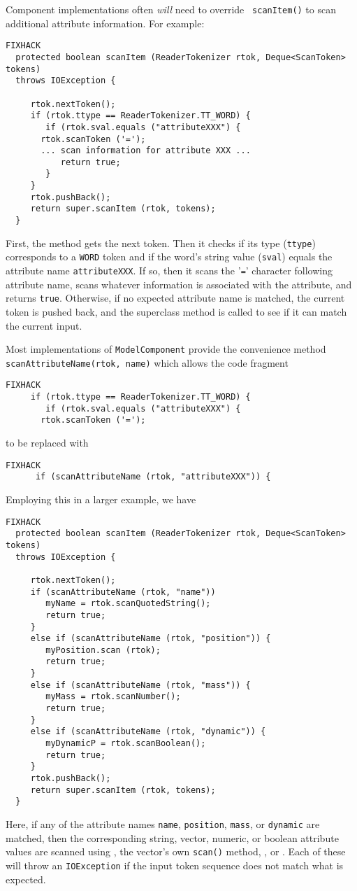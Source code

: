 \documentclass{article}
\begin{document}
Component implementations often {\it will} need to override {\tt
scanItem()} to scan additional attribute information. For example:
\begin{lstlisting}FIXHACK
  protected boolean scanItem (ReaderTokenizer rtok, Deque<ScanToken> tokens)
  throws IOException {

     rtok.nextToken();
     if (rtok.ttype == ReaderTokenizer.TT_WORD) {
        if (rtok.sval.equals ("attributeXXX") {
	   rtok.scanToken ('=');
	   ... scan information for attribute XXX ...
           return true;
        }
     }
     rtok.pushBack();
     return super.scanItem (rtok, tokens);
  }	
\end{lstlisting}
First, the method gets the next token. Then it checks if its type
({\tt ttype}) corresponds to a {\tt WORD} token and if the word's string
value ({\tt sval}) equals the attribute name {\tt attributeXXX}.  If
so, then it scans the '{\tt =}' character following attribute name,
scans whatever information is associated with the attribute, and
returns {\tt true}.  Otherwise, if no expected attribute name is
matched, the current token is pushed back, and the superclass method
is called to see if it can match the current input.

Most implementations of {\tt ModelComponent}
provide the convenience method {\tt scanAttributeName(rtok, name)}
which allows the code fragment 
\begin{lstlisting}FIXHACK
     if (rtok.ttype == ReaderTokenizer.TT_WORD) {        
        if (rtok.sval.equals ("attributeXXX") {
	   rtok.scanToken ('=');
\end{lstlisting}
to be replaced with
\begin{lstlisting}FIXHACK
      if (scanAttributeName (rtok, "attributeXXX")) {
\end{lstlisting}
Employing this in a larger example, we have
\begin{lstlisting}FIXHACK
  protected boolean scanItem (ReaderTokenizer rtok, Deque<ScanToken> tokens)
  throws IOException {

     rtok.nextToken();
     if (scanAttributeName (rtok, "name")) 
        myName = rtok.scanQuotedString();
        return true;
     }
     else if (scanAttributeName (rtok, "position")) {
        myPosition.scan (rtok);
        return true;
     }
     else if (scanAttributeName (rtok, "mass")) {
        myMass = rtok.scanNumber();
        return true;
     }
     else if (scanAttributeName (rtok, "dynamic")) {
        myDynamicP = rtok.scanBoolean();
        return true;
     }
     rtok.pushBack();
     return super.scanItem (rtok, tokens);
  }	
\end{lstlisting}
Here, if any of the attribute names 
{\tt name}, {\tt position}, {\tt mass}, or {\tt dynamic} are matched,
then the 
corresponding string, vector, numeric, or boolean attribute values are
scanned using
, the
vector's own {\tt scan()} method,
, or
.  Each of
these will throw an {\tt IOException} if the input token sequence does
not match what is expected.
\end{document}
